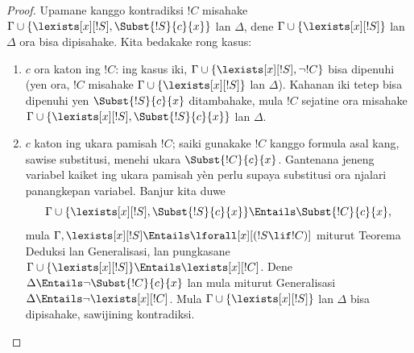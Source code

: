 \documentclass[../../../include/open-logic-section]{subfiles}
\begin{document}
\begin{proof}
Upamane kanggo kontradiksi $!C$ misahake
$\Gamma \cup \{ \lexists[x][!S],
\Subst{!S}{c}{x}\}$ lan $\Delta$, dene
$\Gamma \cup \{\lexists[x][!S] \}$ lan
$\Delta$ ora bisa dipisahake.
Kita bedakake rong kasus:
\begin{enumerate}
\item $c$ ora katon ing $!C$: ing kasus iki,
  $\Gamma \cup \{\lexists[x][!S], \lnot!C \}$
  bisa dipenuhi (yen ora, $!C$ misahake
  $\Gamma \cup \{\lexists[x][!S] \}$ lan
  $\Delta$). Kahanan iki tetep bisa dipenuhi
  yen $\Subst{!S}{c}{x}$ ditambahake, mula
  $!C$ sejatine ora misahake
  $\Gamma \cup \{ \lexists[x][!S],
  \Subst{!S}{c}{x} \}$ lan $\Delta$.
\item $c$ katon ing ukara pamisah $!C$;
  saiki gunakake $!C$ kanggo formula asal
  kang, sawise substitusi, menehi ukara
  $\Subst{!C}{c}{x}$. Gantenana jeneng variabel kaiket ing ukara pamisah yèn perlu supaya substitusi ora njalari panangkepan variabel. Banjur kita duwe
  \[
  \Gamma \cup \{ \lexists[x][!S], \Subst{!S}{c}{x}\} \Entails \Subst{!C}{c}{x},
  \]
  mula $\Gamma, \lexists[x][!S] \Entails
  \lforall[x][(!S \lif !C)]$ miturut Teorema
  Deduksi lan Generalisasi, lan pungkasane
  $\Gamma \cup \{ \lexists[x][!S] \}
  \Entails \lexists[x][!C]$. Dene
  $\Delta \Entails \lnot \Subst{!C}{c}{x}$
  lan mula miturut Generalisasi
  $\Delta \Entails \lnot \lexists[x][!C]$.
  Mula $\Gamma \cup \{\lexists[x][!S] \}$
  lan $\Delta$ bisa dipisahake,
  sawijining kontradiksi.
\end{enumerate}
\end{proof}
\end{document}
